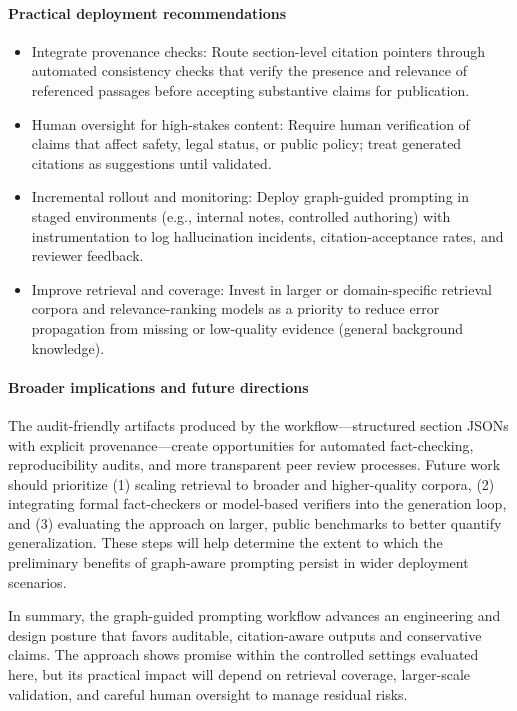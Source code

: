 \paragraph{Practical deployment recommendations}
\begin{itemize}
  \item Integrate provenance checks: Route section-level citation pointers through automated consistency checks that verify the presence and relevance of referenced passages before accepting substantive claims for publication.
  \item Human oversight for high-stakes content: Require human verification of claims that affect safety, legal status, or public policy; treat generated citations as suggestions until validated.
  \item Incremental rollout and monitoring: Deploy graph-guided prompting in staged environments (e.g., internal notes, controlled authoring) with instrumentation to log hallucination incidents, citation-acceptance rates, and reviewer feedback.
  \item Improve retrieval and coverage: Invest in larger or domain-specific retrieval corpora and relevance-ranking models as a priority to reduce error propagation from missing or low-quality evidence (general background knowledge).
\end{itemize}

\paragraph{Broader implications and future directions}
The audit-friendly artifacts produced by the workflow—structured section JSONs with explicit provenance—create opportunities for automated fact-checking, reproducibility audits, and more transparent peer review processes. Future work should prioritize (1) scaling retrieval to broader and higher-quality corpora, (2) integrating formal fact-checkers or model-based verifiers into the generation loop, and (3) evaluating the approach on larger, public benchmarks to better quantify generalization. These steps will help determine the extent to which the preliminary benefits of graph-aware prompting persist in wider deployment scenarios.

In summary, the graph-guided prompting workflow advances an engineering and design posture that favors auditable, citation-aware outputs and conservative claims. The approach shows promise within the controlled settings evaluated here, but its practical impact will depend on retrieval coverage, larger-scale validation, and careful human oversight to manage residual risks.